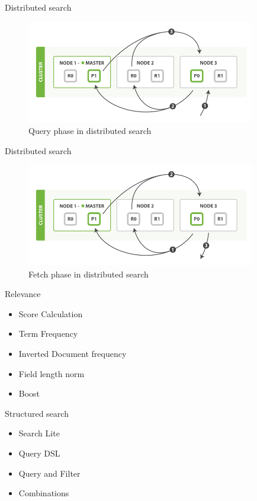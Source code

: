 \documentclass[10pt]{beamer}
\begin{document}
\begin{frame}{Distributed search}
	\begin{figure}
		\centering\includegraphics[width=10cm]{query_phase}
		\caption{Query phase in distributed search}
	\end{figure}
\end{frame}

\begin{frame}{Distributed search}
	\begin{figure}
		\centering\includegraphics[width=10cm]{fetch_phase}
		\caption{Fetch phase in distributed search}
	\end{figure}
\end{frame}



\begin{frame}{Relevance}
	\begin{itemize}
		\item Score Calculation
		\item Term Frequency
		\item Inverted Document frequency
		\item Field length norm
		\item Boost
	\end{itemize}
\end{frame}

\begin{frame}{Structured search}
	\begin{itemize}
		\item Search Lite
		\item Query DSL
		\item Query and Filter
		\item Combinations
	\end{itemize}
\end{frame}
\end{document}
